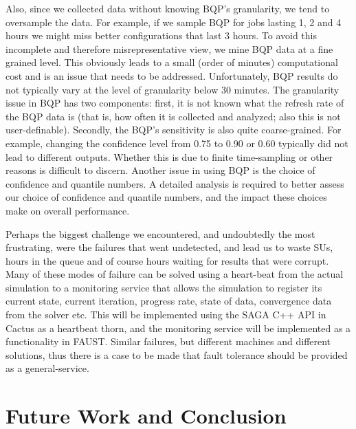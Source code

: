 \documentclass{sig-alternate}
\newcommand{\jhanote}[1]{ {\textcolor{red} { ***Jha: #1 }}}
\newcommand{\jhanote}[1]{}
\begin{document}
Also, since we collected data without knowing BQP's granularity, we tend to oversample the data. For example, if we sample BQP for jobs lasting 1, 2 and 4 hours we might miss better configurations that last 3 hours. To avoid this incomplete and therefore misrepresentative view, we mine BQP data at a fine grained level. This obviously leads to a small (order of minutes) computational cost and is an issue that needs to be addressed. Unfortunately, BQP results do not typically vary at the level of granularity below 30 minutes.  The granularity issue in BQP has two components: first, it is not known what the refresh rate of the BQP data is (that is, how often it is collected and analyzed; also this is not user-definable).  Secondly, the BQP's sensitivity is also quite coarse-grained. For example, changing the confidence level from 0.75 to 0.90 or 0.60 typically did not lead to different outputs.  Whether this is due to finite time-sampling or other reasons is difficult to discern.  Another issue in using  BQP is the choice of confidence and quantile numbers. A detailed analysis is required to better assess our choice of confidence and quantile numbers, and the impact these choices make on overall performance.

Perhaps the biggest challenge we encountered, and undoubtedly the most
frustrating, were the failures that went undetected, and lead us to
waste SUs, hours in the queue and of course hours waiting for results
that were corrupt. Many of these modes of failure can be solved using
a heart-beat from the actual simulation to a monitoring service that
allows the simulation to register its current state, current
iteration, progress rate, state of data, convergence data from the
solver etc. This will be implemented using the SAGA C++ API in Cactus
as a heartbeat thorn, and the monitoring service will be implemented
as a functionality in FAUST.  Similar failures, but
different machines and different solutions, thus there is a case to be
made that fault tolerance should be provided as a general-service.


\section{Future Work and Conclusion}

\end{document}
